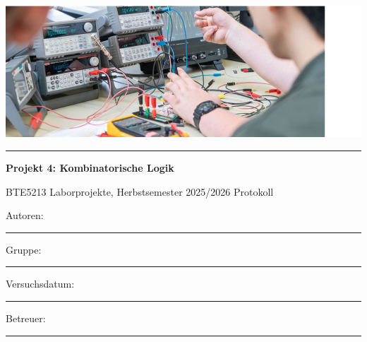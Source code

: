 \begin{titlepage}
    \thispagestyle{empty} %

    \noindent
    \includegraphics[width=\paperwidth,height=0.4\paperheight,keepaspectratio]{titlepage/images/title_page_image.png}

    \vspace{1cm}

    \noindent\colorbox{myyellow}{\rule{\paperwidth}{4pt}}

    \vspace{1cm}

    \begin{center}
        {\Huge\bfseries Projekt 4: Kombinatorische Logik\par}
        \vspace{0.5cm}
        {\Large BTE5213 Laborprojekte, Herbstsemester 2025/2026 Protokoll\par}
    \end{center}

    \vspace{2cm}

    \begin{flushleft}
    {\large
    Autoren:\tab \rule{8cm}{0.4pt}\par
    Gruppe:\tab \rule{8cm}{0.4pt}\par
    Versuchsdatum:\tab \rule{8cm}{0.4pt}\par
    Betreuer:\tab \rule{8cm}{0.4pt}\par
    }
    \end{flushleft}

    \vfill
\end{titlepage}
